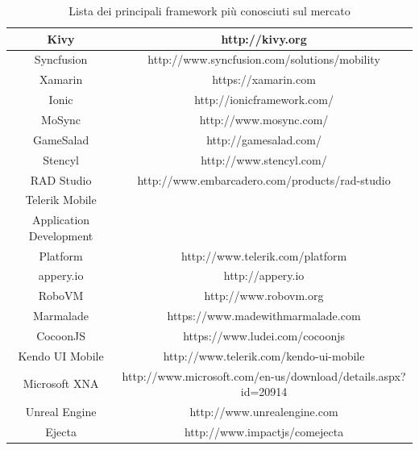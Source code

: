 \begin{table}[!htbp]
\begin{tabular}{cc}
    Kivy                         & http://kivy.org                                              \\\hline
    Syncfusion                   & http://www.syncfusion.com/solutions/mobility                 \\\hline
    Xamarin                      & https://xamarin.com                                          \\\hline
    Ionic                        & http://ionicframework.com/                                   \\\hline
    MoSync                       & http://www.mosync.com/                                       \\\hline
    GameSalad                    & http://gamesalad.com/                                        \\\hline
    Stencyl                      & http://www.stencyl.com/                                      \\\hline
    RAD Studio                   & http://www.embarcadero.com/products/rad-studio               \\\hline
    Telerik Mobile \\   
    Application Development\\
    Platform
    							 & http://www.telerik.com/platform                              \\\hline
    appery.io                    & http://appery.io                                             \\\hline
    RoboVM                       & http://www.robovm.org                                        \\\hline
    Marmalade                    & https://www.madewithmarmalade.com                            \\\hline
    CocoonJS                     & https://www.ludei.com/cocoonjs                               \\\hline
    Kendo UI Mobile              & http://www.telerik.com/kendo-ui-mobile                       \\\hline
    Microsoft XNA                & http://www.microsoft.com/en-us/download/details.aspx?id=20914\\\hline
    Unreal Engine                & http://www.unrealengine.com                                  \\\hline
    Ejecta                       & http://www.impactjs/comejecta                                \\\hline
    \end{tabular}
    \caption{Lista dei principali framework più conosciuti sul mercato}
	\label{tbl: TabellaFrameworks}
\end{table}



